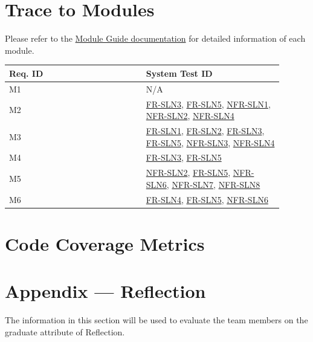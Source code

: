 \documentclass[12pt, titlepage]{article}
\begin{document}
\section{Trace to Modules}	
Please refer to the \href{https://github.com/TPGEngine/tpg/blob/main/docs/Design/SoftArchitecture/MG.pdf}{Module Guide documentation} \citep{MG} for detailed information of each module.
\begin{longtable}{|p{0.45\linewidth}|p{0.45\linewidth}|}
\hline
\textbf{Req. ID} & \textbf{System Test ID} \\
\hline
M1 & N/A\\
\hline
M2 & \hyperref[experiment_visualization]{FR-SLN3}, \hyperref[software_engineering_practices]{FR-SLN5}, \hyperref[usability]{NFR-SLN1}, \hyperref[usability]{NFR-SLN2}, \hyperref[github_actions]{NFR-SLN4} \\
\hline
M3 & \hyperref[mujoco_integration]{FR-SLN1}, \hyperref[mujoco_integration]{FR-SLN2}, \hyperref[experiment_visualization]{FR-SLN3}, \hyperref[software_engineering_practices]{FR-SLN5}, \hyperref[usability]{NFR-SLN3}, \hyperref[github_actions]{NFR-SLN4} \\
\hline
M4 & \hyperref[experiment_visualization]{FR-SLN3}, \hyperref[software_engineering_practices]{FR-SLN5} \\
\hline
M5 & \hyperref[usability]{NFR-SLN2}, \hyperref[software_engineering_practices]{FR-SLN5}, \hyperref[usability]{NFR-SLN6}, \hyperref[operational]{NFR-SLN7}, \hyperref[operational]{NFR-SLN8} \\
\hline
M6 & \hyperref[github_actions]{FR-SLN4}, \hyperref[software_engineering_practices]{FR-SLN5}, \hyperref[usability]{NFR-SLN6} \\
\hline
\end{longtable}	

\section{Code Coverage Metrics}




\newpage{}
\section*{Appendix --- Reflection}

The information in this section will be used to evaluate the team members on the
graduate attribute of Reflection.


\end{document}
